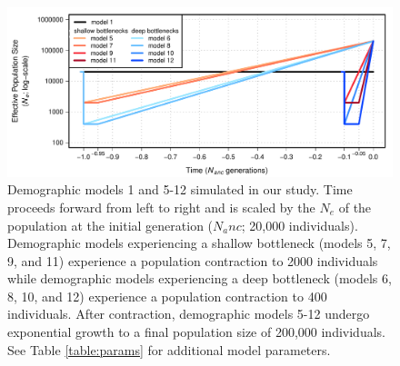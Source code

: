 \documentclass[9pt,twocolumn,twoside]{rilabRxiv}
\begin{document}
\blindtext
\begin{figure}[h!]
\includegraphics[width=.9\linewidth]{figures/FigS2.pdf}
\caption{Demographic models 1 and 5-12 simulated in our study. 
Time proceeds forward from left to right and is scaled by the $N_e$ of the population at the initial generation ($N_anc$; 20,000 individuals). 
Demographic models experiencing a shallow bottleneck (models 5, 7, 9, and 11) experience a population contraction to 2000 individuals while demographic models experiencing a deep bottleneck (models 6, 8, 10, and 12) experience a population contraction to 400 individuals. 
After contraction, demographic models 5-12 undergo exponential growth to a final population size of 200,000 individuals. 
See Table \ref{table:params} for additional model parameters.}
\label{fig:S2}
\end{figure}
\pagebreak


\end{document}
